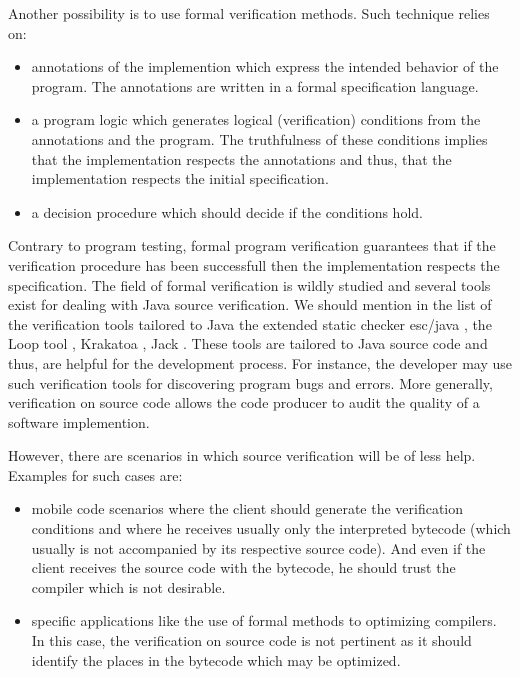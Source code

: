  Another possibility is to use formal verification methods. Such technique relies on:
\begin{itemize} 
   \item annotations of the implemention which express the intended behavior of the program. The annotations
         are written in a formal specification language.
   \item a program logic which  generates logical (verification) conditions  from the annotations and the program. 
         The truthfulness of these conditions implies that the implementation respects the annotations and thus,
	 that the implementation respects the initial specification. 
    
   \item a decision procedure which should decide if the conditions hold.     
           
\end{itemize}
Contrary to program testing,  formal program verification guarantees that if the verification procedure 
has been successfull then the implementation respects the specification. 
 The field of formal  verification is wildly studied and several  tools exist for
dealing with Java source verification. We should mention in the list of the verification tools tailored to Java the extended static checker
esc/java \cite{escjava}, the Loop tool \cite{jacobs03java},
Krakatoa \cite{marche03krakatoa}, Jack \cite{BRL-JACK}. These tools are tailored to Java source code and thus,
 are helpful for the development process. For instance, the developer may use such verification tools for discovering program bugs and
 errors. More generally, verification on source code allows the code producer to audit the quality of a software implemention.
 
However, there are scenarios in which source verification will be of less help. Examples for such cases are:
\begin{itemize}
    \item  mobile code scenarios where the client should generate the verification conditions and where he receives usually only
           the interpreted bytecode (which usually is not accompanied by its respective source code). And even if the client receives the source code
	   with the bytecode, he should trust the compiler which is not desirable.
    \item  specific applications like the use of formal methods to optimizing compilers. In this case, the verification on source code
           is not pertinent as it should identify the places in the bytecode which may be optimized.
\end{itemize} 

